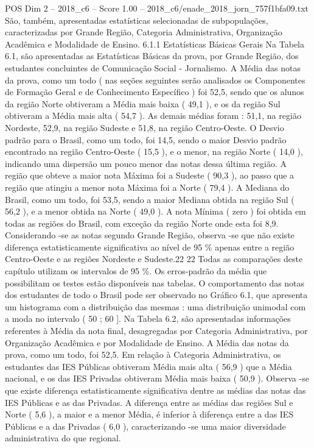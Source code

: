 \begin{textsample}{POS Dim 2 – 2018\_c6 – Score 1.00 – 2018\_c6/enade\_2018\_jorn\_757f1bfa09.txt}
São, também, apresentadas estatísticas selecionadas de subpopulações, caracterizadas por Grande Região, Categoria Administrativa, Organização Acadêmica e Modalidade de Ensino. 6.1.1 Estatísticas Básicas Gerais Na Tabela 6.1, são apresentadas as Estatísticas Básicas da prova, por Grande Região, dos estudantes concluintes de Comunicação Social - Jornalismo.
A Média das notas da prova, como um todo ( nas seções seguintes serão analisados os Componentes de Formação Geral e de Conhecimento Específico ) foi 52,5, sendo que os alunos da região Norte obtiveram a Média mais baixa ( 49,1 ), e os da região Sul obtiveram a Média mais alta ( 54,7 ).
As demais médias foram : 51,1, na região Nordeste, 52,9, na região Sudeste e 51,8, na região Centro-Oeste.
O Desvio padrão para o Brasil, como um todo, foi 14,5, sendo o maior Desvio padrão encontrado na região Centro-Oeste ( 15,5 ), e o menor, na região Norte ( 14,0 ), indicando uma dispersão um pouco menor das notas dessa última região.
A região que obteve a maior nota Máxima foi a Sudeste ( 90,3 ), ao passo que a região que atingiu a menor nota Máxima foi a Norte ( 79,4 ).
A Mediana do Brasil, como um todo, foi 53,5, sendo a maior Mediana obtida na região Sul ( 56,2 ), e a menor obtida na Norte ( 49,0 ).
A nota Mínima ( zero ) foi obtida em todas as regiões do Brasil, com exceção da região Norte onde esta foi 8,9.
Considerando -se as notas segundo Grande Região, observa -se que não existe diferença estatisticamente significativa ao nível de 95 \% apenas entre a região Centro-Oeste e as regiões Nordeste e Sudeste.22 22 Todas as comparações deste capítulo utilizam os intervalos de 95 \%.
Os erros-padrão da média que possibilitam os testes estão disponíveis nas tabelas.
O comportamento das notas dos estudantes de todo o Brasil pode ser observado no Gráfico 6.1, que apresenta um histograma com a distribuição das mesmas : uma distribuição unimodal com a moda no intervalo ( 50 ; 60 ].
Na Tabela 6.2, são apresentadas informações referentes à Média da nota final, desagregadas por Categoria Administrativa, por Organização Acadêmica e por Modalidade de Ensino.
A Média das notas da prova, como um todo, foi 52,5.
Em relação à Categoria Administrativa, os estudantes das IES Públicas obtiveram Média mais alta ( 56,9 ) que a Média nacional, e os das IES Privadas obtiveram Média mais baixa ( 50,9 ).
Observa -se que existe diferença estatisticamente significativa dentre as médias das notas das IES Públicas e as das Privadas.
A diferença entre as médias das regiões Sul e Norte ( 5,6 ), a maior e a menor Média, é inferior à diferença entre a das IES Públicas e a das Privadas ( 6,0 ), caracterizando -se uma maior diversidade administrativa do que regional.

\end{textsample}
